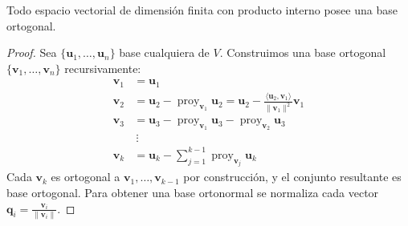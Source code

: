 \begin{theorem}
Todo espacio vectorial de dimensión finita con producto interno posee una base ortogonal.
\begin{proof}
Sea $\{ \mathbf{u}_1, \dots, \mathbf{u}_n \}$ base cualquiera de $V$. Construimos una base ortogonal $\{ \mathbf{v}_1, \dots, \mathbf{v}_n \}$ recursivamente:
\begin{align*}
\mathbf{v}_1 &= \mathbf{u}_1 \\
\mathbf{v}_2 &= \mathbf{u}_2 - \operatorname{proy}_{\mathbf{v}_1} \mathbf{u}_2 = \mathbf{u}_2 - \frac{\langle \mathbf{u}_2, \mathbf{v}_1 \rangle}{\|\mathbf{v}_1\|^2} \mathbf{v}_1 \\
\mathbf{v}_3 &= \mathbf{u}_3 - \operatorname{proy}_{\mathbf{v}_1} \mathbf{u}_3 - \operatorname{proy}_{\mathbf{v}_2} \mathbf{u}_3 \\
&\ \vdots \\
\mathbf{v}_k &= \mathbf{u}_k - \sum_{j=1}^{k-1} \operatorname{proy}_{\mathbf{v}_j} \mathbf{u}_k
\end{align*}
Cada $\mathbf{v}_k$ es ortogonal a $\mathbf{v}_1, \dots, \mathbf{v}_{k-1}$ por construcción, y el conjunto resultante es base ortogonal. Para obtener una base ortonormal se normaliza cada vector \(\mathbf{q}_i = \frac{\mathbf{v}_i}{\|\mathbf{v}_i\|}.\)
\end{proof}
\end{theorem}


